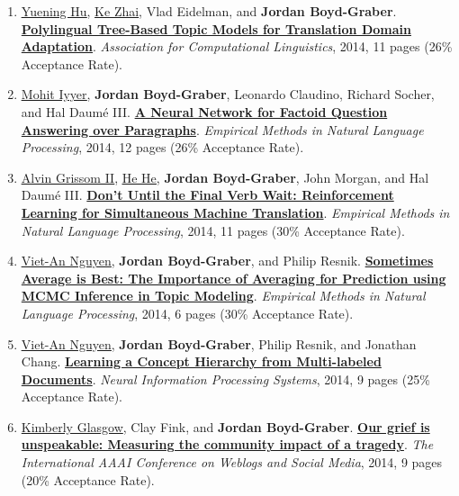 {\begin{enumerate}
	 \item \underline{\href{https://scholar.google.com/citations?user=mO_62fQAAAAJ&hl=en}{Yuening Hu}}, \underline{\href{https://kzhai.github.io/}{Ke Zhai}}, Vlad Eidelman, and {\bf Jordan Boyd-Graber}.  {\bf \href{http://cs.umd.edu/~jbg//docs/2014_acl_ptlda_mt.pdf}{Polylingual Tree-Based Topic Models for Translation Domain Adaptation}}.  \emph{Association for Computational Linguistics}, 2014, 11 pages (26\% Acceptance Rate).

	 \item \underline{\href{https://people.cs.umass.edu/~miyyer/}{Mohit Iyyer}}, {\bf Jordan Boyd-Graber}, Leonardo Claudino, Richard Socher, and Hal {Daum\'{e} III}.  {\bf \href{http://cs.umd.edu/~jbg//docs/2014_emnlp_qb_rnn.pdf}{A Neural Network for Factoid Question Answering over Paragraphs}}.  \emph{Empirical Methods in Natural Language Processing}, 2014, 12 pages (26\% Acceptance Rate).

	 \item \underline{\href{https://agrissom.sites.haverford.edu/}{Alvin Grissom II}}, \underline{\href{https://hhexiy.github.io/}{He He}}, {\bf Jordan Boyd-Graber}, John Morgan, and Hal {Daum\'{e} III}.  {\bf \href{http://cs.umd.edu/~jbg//docs/2014_emnlp_simtrans.pdf}{Don't Until the Final Verb Wait: Reinforcement Learning for Simultaneous Machine Translation}}.  \emph{Empirical Methods in Natural Language Processing}, 2014, 11 pages (30\% Acceptance Rate).

	 \item \underline{\href{https://viet-an.github.io/}{Viet-An Nguyen}}, {\bf Jordan Boyd-Graber}, and Philip Resnik.  {\bf \href{http://cs.umd.edu/~jbg//docs/2014_emnlp_howto_gibbs.pdf}{Sometimes Average is Best: The Importance of Averaging for Prediction using MCMC Inference in Topic Modeling}}.  \emph{Empirical Methods in Natural Language Processing}, 2014, 6 pages (30\% Acceptance Rate).

	 \item \underline{\href{https://viet-an.github.io/}{Viet-An Nguyen}}, {\bf Jordan Boyd-Graber}, Philip Resnik, and Jonathan Chang.  {\bf \href{http://cs.umd.edu/~jbg//docs/2014_nips_l2h.pdf}{Learning a Concept Hierarchy from Multi-labeled Documents}}.  \emph{Neural Information Processing Systems}, 2014, 9 pages (25\% Acceptance Rate).

	 \item \underline{Kimberly Glasgow}, Clay Fink, and {\bf Jordan Boyd-Graber}.  {\bf \href{http://cs.umd.edu/~jbg//docs/2014_icwsm_grief.pdf}{Our grief is unspeakable: Measuring the community impact of a tragedy}}.  \emph{The International AAAI Conference on Weblogs and Social Media}, 2014, 9 pages (20\% Acceptance Rate).


\end{enumerate}}
